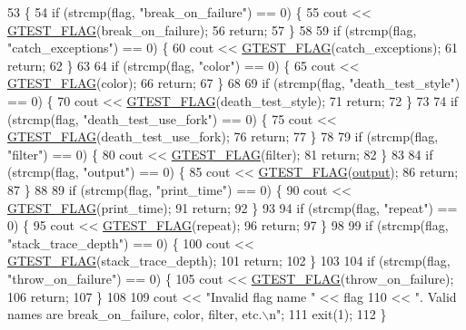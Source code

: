 {\begin{DoxyCode}
53                                  \{
54   \textcolor{keywordflow}{if} (strcmp(flag, \textcolor{stringliteral}{"break\_on\_failure"}) == 0) \{
55     cout << \hyperlink{gtest-port_8h_a828f4e34a1c4b510da50ec1563e3562a}{GTEST\_FLAG}(break\_on\_failure);
56     \textcolor{keywordflow}{return};
57   \}
58 
59   \textcolor{keywordflow}{if} (strcmp(flag, \textcolor{stringliteral}{"catch\_exceptions"}) == 0) \{
60     cout << \hyperlink{gtest-port_8h_a828f4e34a1c4b510da50ec1563e3562a}{GTEST\_FLAG}(catch\_exceptions);
61     \textcolor{keywordflow}{return};
62   \}
63 
64   \textcolor{keywordflow}{if} (strcmp(flag, \textcolor{stringliteral}{"color"}) == 0) \{
65     cout << \hyperlink{gtest-port_8h_a828f4e34a1c4b510da50ec1563e3562a}{GTEST\_FLAG}(color);
66     \textcolor{keywordflow}{return};
67   \}
68 
69   \textcolor{keywordflow}{if} (strcmp(flag, \textcolor{stringliteral}{"death\_test\_style"}) == 0) \{
70     cout << \hyperlink{gtest-port_8h_a828f4e34a1c4b510da50ec1563e3562a}{GTEST\_FLAG}(death\_test\_style);
71     \textcolor{keywordflow}{return};
72   \}
73 
74   \textcolor{keywordflow}{if} (strcmp(flag, \textcolor{stringliteral}{"death\_test\_use\_fork"}) == 0) \{
75     cout << \hyperlink{gtest-port_8h_a828f4e34a1c4b510da50ec1563e3562a}{GTEST\_FLAG}(death\_test\_use\_fork);
76     \textcolor{keywordflow}{return};
77   \}
78 
79   \textcolor{keywordflow}{if} (strcmp(flag, \textcolor{stringliteral}{"filter"}) == 0) \{
80     cout << \hyperlink{gtest-port_8h_a828f4e34a1c4b510da50ec1563e3562a}{GTEST\_FLAG}(filter);
81     \textcolor{keywordflow}{return};
82   \}
83 
84   \textcolor{keywordflow}{if} (strcmp(flag, \textcolor{stringliteral}{"output"}) == 0) \{
85     cout << \hyperlink{gtest-port_8h_a828f4e34a1c4b510da50ec1563e3562a}{GTEST\_FLAG}(\hyperlink{namespacegmock__output__test_a4277f8598ba3835393fe82e82d09375d}{output});
86     \textcolor{keywordflow}{return};
87   \}
88 
89   \textcolor{keywordflow}{if} (strcmp(flag, \textcolor{stringliteral}{"print\_time"}) == 0) \{
90     cout << \hyperlink{gtest-port_8h_a828f4e34a1c4b510da50ec1563e3562a}{GTEST\_FLAG}(print\_time);
91     \textcolor{keywordflow}{return};
92   \}
93 
94   \textcolor{keywordflow}{if} (strcmp(flag, \textcolor{stringliteral}{"repeat"}) == 0) \{
95     cout << \hyperlink{gtest-port_8h_a828f4e34a1c4b510da50ec1563e3562a}{GTEST\_FLAG}(repeat);
96     \textcolor{keywordflow}{return};
97   \}
98 
99   \textcolor{keywordflow}{if} (strcmp(flag, \textcolor{stringliteral}{"stack\_trace\_depth"}) == 0) \{
100     cout << \hyperlink{gtest-port_8h_a828f4e34a1c4b510da50ec1563e3562a}{GTEST\_FLAG}(stack\_trace\_depth);
101     \textcolor{keywordflow}{return};
102   \}
103 
104   \textcolor{keywordflow}{if} (strcmp(flag, \textcolor{stringliteral}{"throw\_on\_failure"}) == 0) \{
105     cout << \hyperlink{gtest-port_8h_a828f4e34a1c4b510da50ec1563e3562a}{GTEST\_FLAG}(throw\_on\_failure);
106     \textcolor{keywordflow}{return};
107   \}
108 
109   cout << \textcolor{stringliteral}{"Invalid flag name "} << flag
110        << \textcolor{stringliteral}{".  Valid names are break\_on\_failure, color, filter, etc.\(\backslash\)n"};
111   exit(1);
112 \}
\end{DoxyCode}
}
